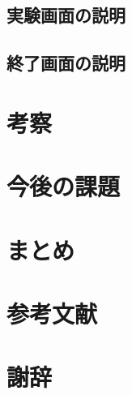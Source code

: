 \documentclass[11pt,a4paper]{jsarticle}
\begin{document}
\subsection{実験画面の説明}
\subsection{終了画面の説明}
\section{考察}
\section{今後の課題}
\section{まとめ}
\section{参考文献}
\section{謝辞}
%
%
\end{document}
